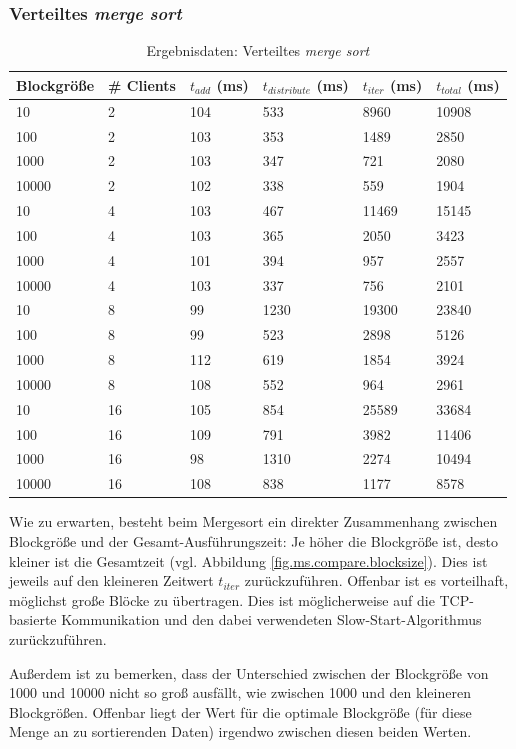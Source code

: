\documentclass[fontsize=12pt,a4paper,headinclude=no,headings=small]{scrartcl}
\begin{document}
\subsubsection{Verteiltes \textit{merge sort}}
\begin{table}[htp]
\begin{tabularx}{\textwidth}{ |X|X|X|X|X|X| }
\hline
Blockgröße & \# Clients & $t_{add}$ (ms) & $t_{distribute}$ (ms) & $t_{iter}$ (ms) & $t_{total}$ (ms) \\
\hline
10 & 2 & 104 & 533 & 8960 & 10908 \\
100 & 2 & 103 & 353 & 1489 & 2850 \\
1000 & 2 & 103 & 347 & 721 & 2080 \\
10000 & 2 & 102 & 338 & 559 & 1904 \\
\hline
10 & 4 & 103 & 467 & 11469 & 15145 \\
100 & 4 & 103 & 365 & 2050 & 3423 \\
1000 & 4 & 101 & 394 & 957 & 2557 \\
10000 & 4 & 103 & 337 & 756 & 2101 \\
\hline
10 & 8 & 99 & 1230 & 19300 & 23840 \\
100 & 8 & 99 & 523 & 2898 & 5126 \\
1000 & 8 & 112 & 619 & 1854 & 3924 \\
10000 & 8 & 108 & 552 & 964 & 2961 \\
\hline
10 & 16 & 105 & 854 & 25589 & 33684 \\
100 & 16 & 109 & 791 & 3982 & 11406 \\
1000 & 16 & 98 & 1310 & 2274 & 10494 \\
10000 & 16 & 108 & 838 & 1177 & 8578 \\
\hline
\end{tabularx}
\caption{Ergebnisdaten: Verteiltes \textit{merge sort}}
\end{table}
Wie zu erwarten, besteht beim Mergesort ein direkter Zusammenhang zwischen Blockgröße und der Gesamt-Ausführungszeit: Je höher die Blockgröße ist, desto kleiner ist die Gesamtzeit (vgl. Abbildung \ref{fig.ms.compare.blocksize}). Dies ist jeweils auf den kleineren Zeitwert $t_{iter}$ zurückzuführen. Offenbar ist es vorteilhaft, möglichst große Blöcke zu übertragen. Dies ist möglicherweise auf die TCP-basierte Kommunikation und den dabei verwendeten Slow-Start-Algorithmus zurückzuführen.

Außerdem ist zu bemerken, dass der Unterschied zwischen der Blockgröße von 1000 und 10000 nicht so groß ausfällt, wie zwischen 1000 und den kleineren Blockgrößen. Offenbar liegt der Wert für die optimale Blockgröße (für diese Menge an zu sortierenden Daten) irgendwo zwischen diesen beiden Werten.
\end{document}
